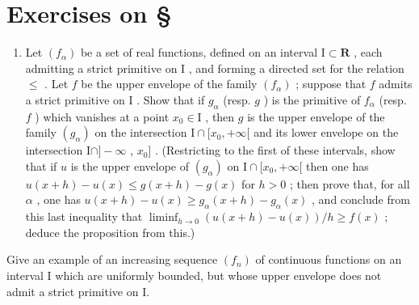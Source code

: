 \section*{Exercises on \S{}}
{}

\begin{enumerate}
\def\labelenumi{\arabic{enumi})}
\tightlist
\item
  Let \((f_{\alpha})\) be a set of real functions, defined on an interval \(\mathrm{I} \subset \mathbf{R}\) , each admitting a strict primitive on \(\mathrm{I}\) , and forming a directed set for the relation \(\leqslant\) . Let \(f\) be the upper envelope of the family \((f_{\alpha})\) ; suppose that \(f\) admits a strict primitive on \(\mathrm{I}\) . Show that if \(g_{\alpha}\) (resp. \(g\) ) is the primitive of \(f_{\alpha}\) (resp. \(f\) ) which vanishes at a point \(x_0 \in \mathrm{I}\) , then \(g\) is the upper envelope of the family \((g_{\alpha})\) on the intersection \(\mathrm{I} \cap [x_0, +\infty[\) and its lower envelope on the intersection \(\mathrm{I} \cap ] - \infty\) , \(x_0]\) . (Restricting to the first of these intervals, show that if \(u\) is the upper envelope of \((g_{\alpha})\) on \(\mathrm{I} \cap [x_0, +\infty[\) then one has \(u(x + h) - u(x) \leqslant g(x + h) - g(x)\) for \(h > 0\) ; then prove that, for all \(\alpha\) , one has \(u(x + h) - u(x) \geqslant g_{\alpha}(x + h) - g_{\alpha}(x)\) , and conclude from this last inequality that \(\liminf_{h \to 0} (u(x + h) - u(x))/h \geqslant f(x)\) ; deduce the proposition from this.)
\end{enumerate}

Give an example of an increasing sequence \((f_n)\) of continuous functions on an interval I which are uniformly bounded, but whose upper envelope does not admit a strict primitive on I.

